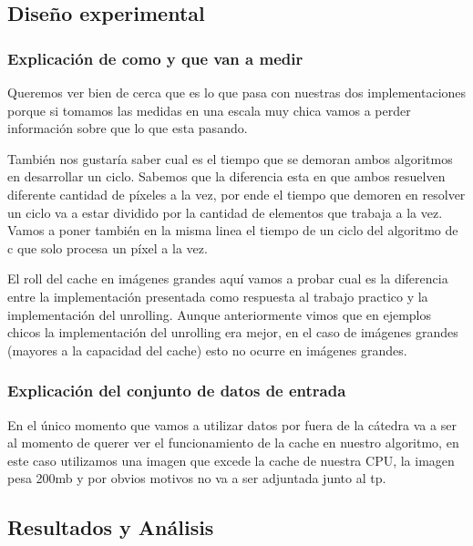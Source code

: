 \subsection{Diseño experimental}
\subsubsection*{Explicación de como y que van a medir}
Queremos ver bien de cerca que es lo que pasa con nuestras dos implementaciones porque si tomamos las medidas en una escala muy chica vamos a perder información sobre que lo que esta pasando. 

También nos gustaría saber cual es el tiempo que se demoran ambos algoritmos en desarrollar un ciclo. Sabemos que la diferencia esta en que ambos resuelven diferente cantidad de  píxeles a la vez, por ende el tiempo que demoren en resolver un ciclo va a estar dividido por la cantidad de elementos que trabaja a la vez. Vamos a poner también en la misma linea el tiempo de un ciclo del algoritmo de c que solo procesa un píxel a la vez.

El roll del cache en imágenes grandes aquí vamos a probar cual es la diferencia entre la implementación presentada como respuesta al trabajo practico y la implementación del unrolling. Aunque anteriormente vimos que en ejemplos chicos la implementación del unrolling era mejor, en el caso de imágenes grandes (mayores a la capacidad del cache) esto no ocurre en imágenes grandes.
\subsubsection*{Explicación del conjunto de datos de entrada}
En el único momento que vamos a utilizar datos por fuera de la cátedra va a ser al momento de querer ver el funcionamiento de la cache en nuestro algoritmo, en este caso utilizamos una imagen que excede la cache de nuestra CPU, la imagen pesa 200mb y por obvios motivos no va a ser adjuntada junto al tp.
\subsection{Resultados y Análisis}
